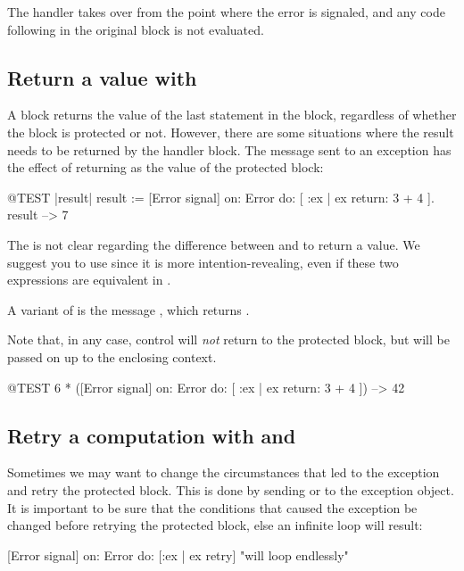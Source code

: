 \documentclass[a4paper,10pt,twoside]{book}
\begin{document}
The handler takes over from the point where the error is signaled, and any code following in the original block is not evaluated.

\subsection{Return a value with }
A block returns the value of the last statement in the block, regardless of whether the block is protected or not. However, there are some situations where the result needs to be returned by the handler block. The message  sent to an exception has the effect of returning  as the value of the protected block:

\begin{code}{@TEST |result|}
result := [Error signal]
	on: Error
	do: [ :ex | ex return: 3 + 4 ].
result --> 7
\end{code}

The  is not clear regarding the difference between  and  to return a value. We suggest you to use  since it is more intention-revealing, even if these two expressions are equivalent in \pharo.

A variant of  is the message , which returns . 

Note that, in any case, control will \emph{not} return to the protected block, but will be passed on up to the enclosing context.

\begin{code}{@TEST}
6 * ([Error signal] on: Error do: [ :ex | ex return: 3 + 4 ]) --> 42
\end{code}

\subsection{Retry a computation with  and }

Sometimes we may want to change the circumstances that led to the exception and retry the protected block. This is done by sending  or  to the exception object. It is important to be sure that the conditions that caused the exception be changed before retrying the protected block, else an infinite  loop will result:
\begin{code}{}
[Error signal] on: Error do: [:ex | ex retry]    "will loop endlessly"
\end{code}
\end{document}
